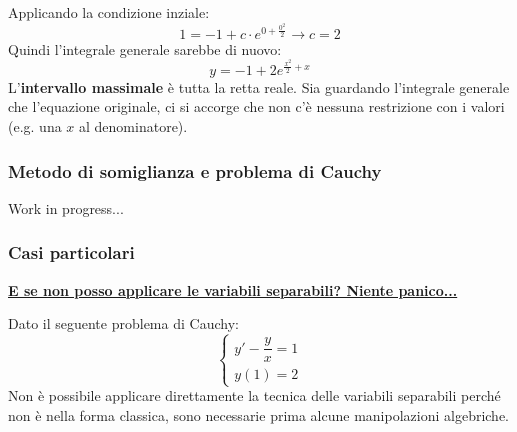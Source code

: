 \documentclass[a4paper]{article}
\newcommand{\example}[1]{\textcolor{Green4}{\textbf{#1}}}
\begin{document}
	Applicando la condizione inziale:
	\begin{equation*}
		1 = -1 + c \cdot e^{0+\frac{0^{2}}{2}} \longrightarrow c = 2
	\end{equation*}
	Quindi l'integrale generale sarebbe di nuovo:
	\begin{equation*}
		y = - 1 + 2e^{\frac{x^{2}}{2} + x}
	\end{equation*}
	L'\textbf{intervallo massimale} è tutta la retta reale. Sia guardando l'integrale generale che l'equazione originale, ci si accorge che non c'è nessuna restrizione con i valori (e.g. una $x$ al denominatore).\newpage

	\subsubsection{Metodo di somiglianza e problema di Cauchy}\label{subsubsection: metodo di somiglianza e problema di Cauchy}
	
	Work in progress...
	\newpage

	\subsubsection{Casi particolari}\label{subsubsection: casi particolari equazioni differenziali}

	\begin{flushleft}
		\example{\underline{E se non posso applicare le variabili separabili? Niente panico...}}
	\end{flushleft}

	\noindent
	Dato il seguente problema di Cauchy:
	\begin{equation*}
		\begin{cases}
			y' - \dfrac{y}{x} = 1 \\
			y\left(1\right) = 2
		\end{cases}
	\end{equation*}
	Non è possibile applicare direttamente la tecnica delle variabili separabili perché non è nella forma classica, sono necessarie prima alcune manipolazioni algebriche.\newline
\end{document}
